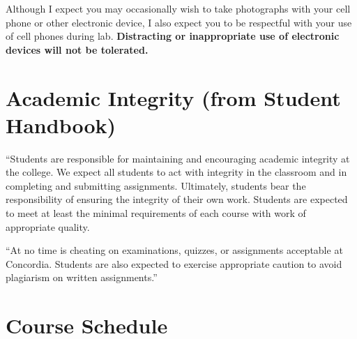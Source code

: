 \documentclass{tufte-handout}
\begin{document}
Although I expect you may occasionally wish to take photographs with your cell phone or other electronic device, I also expect you to be respectful with your use of cell phones during lab. \textbf{Distracting or inappropriate use of electronic devices will not be tolerated.}

\section{Academic Integrity (from Student Handbook)}



``Students are responsible for maintaining and encouraging academic integrity at the college. We expect all students to act with integrity in the classroom and in completing and submitting assignments. Ultimately, students bear the responsibility of ensuring the integrity of their own work. Students are expected to meet at least the minimal requirements of each course with work of appropriate quality. 


``At no time is cheating on examinations, quizzes, or assignments acceptable at Concordia. Students are also expected to exercise appropriate caution to avoid plagiarism on written assignments.''

\section{Course Schedule}
\end{document}
